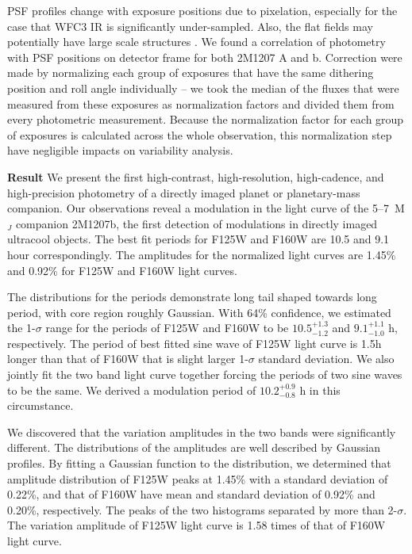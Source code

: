 \documentclass[12pt]{article}
\begin{document}
PSF profiles change with exposure positions due to
pixelation, especially for the case that WFC3 IR is significantly
under-sampled. Also, the flat fields may potentially have large scale
structures \cite{dressel2012wide}. We found a correlation of
photometry with PSF positions on detector frame for both 2M1207 A and
b. Correction were made by normalizing each group of
exposures that have the same dithering position and roll angle
individually -- we took the median of the fluxes that were measured
from these exposures as normalization factors and divided them from
every photometric measurement. Because the normalization factor for
each group of exposures is calculated across the whole observation,
this normalization step have negligible impacts on variability
analysis.

\textbf{Result}
We present the first high-contrast, high-resolution, high-cadence, and
high-precision photometry of a directly imaged planet or
planetary-mass companion. Our observations reveal a modulation in the
light curve of the 5--7~M$_{J}$ companion 2M1207b, the first detection
of modulations in directly imaged ultracool objects.  The best fit
periods for F125W and F160W are 10.5 and 9.1 hour correspondingly. The
amplitudes for the normalized light curves are 1.45\% and 0.92\% for
F125W and F160W light curves.

The distributions for the periods demonstrate long tail shaped towards
long period, with core region roughly Gaussian. With 64\% confidence,
we estimated the 1-$\sigma$ range for the periods of F125W and F160W
to be $10.5_{-1.2}^{+1.3}$ and $9.1_{-1.0}^{+1.1}$ h,
respectively. The period of best fitted sine wave of F125W light
curve is 1.5h longer than that of F160W  that is slight larger
1-$\sigma$ standard deviation. We also jointly fit the two band light
curve together forcing the periods of two sine waves to be the
same. We derived a modulation period of $10.2^{+0.9}_{-0.8}$ h in this
circumstance. 

We discovered that  the variation amplitudes in the two bands were significantly
different. The distributions of the amplitudes are well described by
Gaussian profiles. By fitting a Gaussian function to the distribution, we
determined that amplitude distribution of F125W peaks at 1.45\% with a
standard deviation of 0.22\%, and that of F160W have mean and standard
deviation of 0.92\% and 0.20\%, respectively. The peaks of the two
histograms separated by more than 2-$\sigma$. The variation amplitude
of F125W light curve is 1.58 times of that of F160W light curve.
\end{document}
